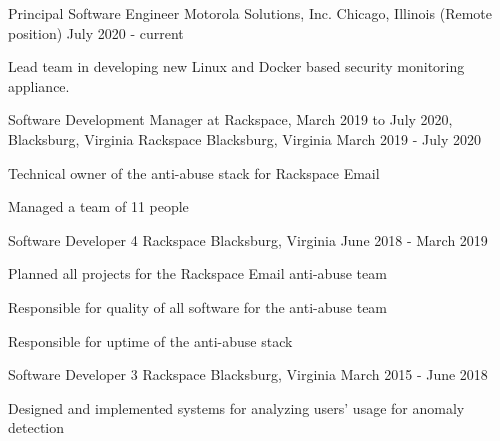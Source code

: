 

\begin{cventries}

  \cventry
    {Principal Software Engineer} %
    {Motorola Solutions, Inc.} %
    {Chicago, Illinois (Remote position)} %
    {July 2020 - current} %
    {
      \begin{cvitems} %
        \item {Lead team in developing new Linux and Docker based security monitoring appliance.}
      \end{cvitems}
    }

  \cventry
    {Software Development Manager at Rackspace, March 2019 to July 2020, Blacksburg, Virginia} %
    {Rackspace} %
    {Blacksburg, Virginia} %
    {March 2019 - July 2020} %
    {
      \begin{cvitems} %
        \item {Technical owner of the anti-abuse stack for Rackspace Email}
        \item {Managed a team of 11 people}
      \end{cvitems}
    }

  \cventry
    {Software Developer 4} %
    {Rackspace} %
    {Blacksburg, Virginia} %
    {June 2018 - March 2019} %
    {
      \begin{cvitems} %
        \item {Planned all projects for the Rackspace Email anti-abuse team}
        \item {Responsible for quality of all software for the anti-abuse team}
        \item {Responsible for uptime of the anti-abuse stack}
      \end{cvitems}
    }

  \cventry
    {Software Developer 3}
    {Rackspace} %
    {Blacksburg, Virginia} %
    {March 2015 - June 2018} %
    {
      \begin{cvitems} %
        \item {Designed and implemented systems for analyzing users' usage for anomaly detection}
      \end{cvitems}
    }


\end{cventries}
